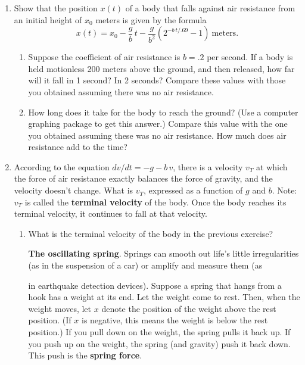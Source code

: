 \begin{enumerate}
\item \label{ex:falling body2} Show that the position $x(t)$ of a body
that falls against air resistance from an initial height of $x_0$
meters is given by the formula
	\[
x(t) = x_0 - \dfrac{g}{b} \, t - \dfrac{g}{b^2}
		\left(2^{-b\,t/.69} - 1\right) \ \mbox{meters}.
\]


  \begin{enumerate}
  \item \label{ex:falling body3} Suppose the coefficient of air resistance
is $b = .2$ per second.  If a body is held motionless 200 meters above
the ground, and then released, how far will it fall in 1 second?  In 2
seconds?  Compare these values with those you obtained assuming there
was no air resistance.

  \item How long does it take for the body to reach the ground?  (Use a computer graphing package to get this answer.)  Compare this value with the one you obtained assuming these was no air resistance.  How much does air resistance add to the time?



\end{enumerate}
\item According to the equation $dv/dt = -g - b\,v$, there is a velocity $v_T$ at which the force of air resistance exactly balances the force of gravity, and the velocity doesn't change.  What is $v_T$, expressed as a function of $g$ and $b$.  Note: $v_T$ is called the {\bf terminal velocity} of the body.  Once the body reaches its terminal velocity, it continues to fall at that velocity.

  \begin{enumerate}
  \item What is the terminal velocity of the body in the previous exercise?
\label{fall w/air-end}






{\bf The oscillating spring}.\label{spring-begin} Springs can smooth out life's little
irregularities (as in the suspension of a car) or amplify and measure
them (as \linebreak



in earthquake detection devices).  Suppose a spring that hangs from a
hook has a weight at its end.  Let the weight come to rest.  Then,
when the weight moves, let $x$ denote the position of the weight above
the rest position.  (If $x$ is negative, this means the weight is
below the rest position.)  If you pull down on the weight, the spring
pulls it back up.  If you push up on the weight, the spring (and
gravity) push it back down.  This push is the {\bf spring
  force}.


\end{enumerate}
\end{enumerate}
